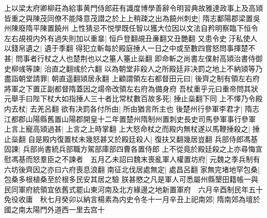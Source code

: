 上以梁太府卿柳莊為給事黄門侍郎莊有識度博學善辭令明習典故雅達政事上及高熲皆重之與陳茂同僚不能降意茂譛之於上上稍疎之出為饒州刺史|{
	隋志鄱陽郡梁置吳州陳廢隋平陳置饒州}
上性猜忌不悦學既任智以獲大位因以文法自矜明察臨下恒令左右覘視内外有過失則加以重辠|{
	恒戶登翻覘丑亷翻又丑艷翻}
又患令史汙私使人以錢帛遺之|{
	遺于季翻}
得犯立斬每於殿庭捶人一日之中或至數四嘗怒問事揮楚不甚|{
	問事者行杖之人也楚荆也以之箠人箠止橤翻}
即命斬之尚書左僕射高熲治書侍御史柳彧等諫|{
	治直之翻彧於六翻}
以為朝堂非殺人之所殿廷非决罰之地上不納熲等乃盡詣朝堂請罪|{
	朝直遥翻熲居永翻}
上顧謂領左右都督田元曰|{
	後齊之制有領左右府將軍之下置正副都督隋蓋因之煬帝改領左右府為備身府}
吾杖重乎元曰重帝問其狀元舉手曰陛下杖大如指捶人三十者比常杖數百故多死|{
	捶止橤翻下同}
上不懌乃令殿内去杖|{
	去羌呂翻}
欲有决罰各付所由|{
	所由猶言所主也}
後楚州行參軍李君才|{
	隋志江都郡山陽縣舊置山陽郡開皇十二年置楚州隋制州置刺史長史司馬參軍事行參軍}
上言上寵高熲過甚|{
	上言之上時掌翻}
上大怒命杖之而殿内無杖遂以馬鞭捶殺之|{
	捶止橤翻}
自是殿内復置杖未幾怒甚又於殿廷殺人|{
	復扶又翻幾居豈翻}
兵部侍郎馮基固諫|{
	兵部尚書統兵部職方駕部庫部四曹各置侍郎}
上不從竟於殿廷殺之上亦尋悔宣慰馮基而怒羣臣之不諫者　五月乙未詔曰魏末喪亂軍人權置坊府|{
	元魏之季兵制有六坊後齊因之亦曰六府喪息浪翻}
南征北伐居處無定|{
	處昌呂翻}
家無完堵地罕包桑|{
	包桑多根植桑至於根多民安其居之驗}
朕甚愍之凡是軍人可悉屬州縣墾田籍帳一與民同軍府統領宜依舊式罷山東河南及北方緣邊之地新置軍府　六月辛酉制民年五十免役收庸　秋七月癸卯以納言楊素為内史令冬十一月辛丑上祀南郊|{
	隋南郊為壇於國之南太陽門外道西一里去宫十}


